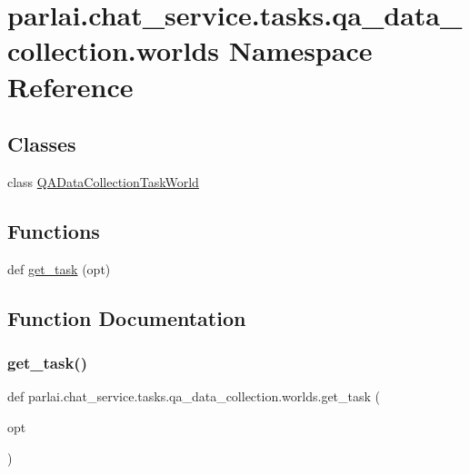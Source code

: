 \hypertarget{namespaceparlai_1_1chat__service_1_1tasks_1_1qa__data__collection_1_1worlds}{}\section{parlai.\+chat\+\_\+service.\+tasks.\+qa\+\_\+data\+\_\+collection.\+worlds Namespace Reference}
\label{namespaceparlai_1_1chat__service_1_1tasks_1_1qa__data__collection_1_1worlds}
\subsection*{Classes}
\begin{DoxyCompactItemize}
\item 
class \hyperlink{classparlai_1_1chat__service_1_1tasks_1_1qa__data__collection_1_1worlds_1_1QADataCollectionTaskWorld}{Q\+A\+Data\+Collection\+Task\+World}
\end{DoxyCompactItemize}
\subsection*{Functions}
\begin{DoxyCompactItemize}
\item 
def \hyperlink{namespaceparlai_1_1chat__service_1_1tasks_1_1qa__data__collection_1_1worlds_a2e51acfa39bb591f618ea3716f7d35e0}{get\+\_\+task} (opt)
\end{DoxyCompactItemize}


\subsection{Function Documentation}
\mbox{\label{namespaceparlai_1_1chat__service_1_1tasks_1_1qa__data__collection_1_1worlds_a2e51acfa39bb591f618ea3716f7d35e0}} 
\subsubsection{\texorpdfstring{get\+\_\+task()}{get\_task()}}
{\footnotesize\ttfamily def parlai.\+chat\+\_\+service.\+tasks.\+qa\+\_\+data\+\_\+collection.\+worlds.\+get\+\_\+task (\begin{DoxyParamCaption}\item[{}]{opt }\end{DoxyParamCaption})}



